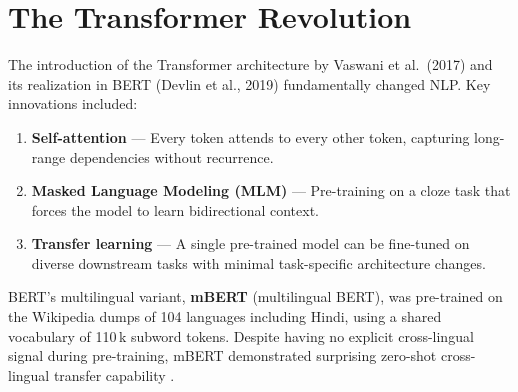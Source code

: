 \section{The Transformer Revolution}

The introduction of the Transformer architecture by Vaswani et al.\ (2017) \cite{vaswani2017} and its realization in BERT (Devlin et al., 2019) \cite{devlin2019} fundamentally changed NLP. Key innovations included:

\begin{enumerate}[itemsep=3pt]
  \item \textbf{Self-attention} — Every token attends to every other token, capturing long-range dependencies without recurrence.
  \item \textbf{Masked Language Modeling (MLM)} — Pre-training on a cloze task that forces the model to learn bidirectional context.
  \item \textbf{Transfer learning} — A single pre-trained model can be fine-tuned on diverse downstream tasks with minimal task-specific architecture changes.
\end{enumerate}

BERT's multilingual variant, \textbf{mBERT} (multilingual BERT), was pre-trained on the Wikipedia dumps of 104 languages including Hindi, using a shared vocabulary of 110\,k subword tokens. Despite having no explicit cross-lingual signal during pre-training, mBERT demonstrated surprising zero-shot cross-lingual transfer capability \cite{pires2019}.
